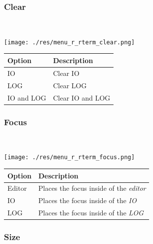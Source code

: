 \subsubsection{Clear}\\

\texttt{[image: ./res/menu\_r\_rterm\_clear.png]}\\

\begin{scriptsize}\begin{tabularx}{\textwidth}{>{\hsize=0.3\hsize}X>{\hsize=0.7\hsize}X}\\
    \hline
    \textbf{Option} & \textbf{Description} \\
    \hline
    IO & Clear IO \\
    LOG & Clear LOG \\
    IO and LOG & Clear IO and LOG \\
    \hline
  \end{tabularx}\end{scriptsize}


\hypertarget{menu_r_rterm_focus}{}
\subsubsection{Focus}\\

\texttt{[image: ./res/menu\_r\_rterm\_focus.png]}\\

\begin{scriptsize}\begin{tabularx}{\textwidth}{>{\hsize=0.3\hsize}X>{\hsize=0.7\hsize}X}\\
    \hline
    \textbf{Option} & \textbf{Description} \\
    \hline
    Editor & Places the focus inside of the \textit{editor} \\
    IO & Places the focus inside of the \textit{IO} \\
    LOG & Places the focus inside of the \textit{LOG} \\
    \hline
  \end{tabularx}\end{scriptsize}


\hypertarget{menu_r_rterm_size}{}
\subsubsection{Size}\\

